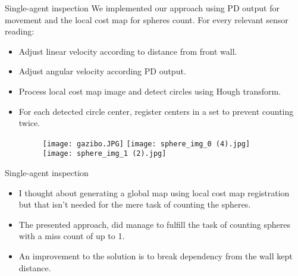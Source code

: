 \documentclass[10pt]{beamer}
\begin{document}
\begin{frame}{Single-agent inspection}
We implemented our approach using PD output for movement and the local cost map  for spheres count. For every relevant sensor reading:
\graphicspath{{images/}}
\begin{itemize}
    \item Adjust linear velocity according to distance from front wall.
    \item Adjust angular velocity according PD output.
    \item Process local cost map image and detect circles using Hough transform.
    \item For each detected circle center, register centers in a set to prevent counting twice.
    \bigskip
    
    \begin{figure}[htp]
    \texttt{[image: gazibo.JPG]}
    \texttt{[image: sphere\_img\_0 (4).jpg]}
    \texttt{[image: sphere\_img\_1 (2).jpg]}

    \label{fig:galaxy}
\end{figure}
\end{itemize}
\end{frame}

\begin{frame}{Single-agent inspection}
\begin{itemize}
    \item I thought about generating a global map using local cost map registration but that isn't needed for the mere task of counting the spheres.
    \item The presented approach, did manage to fulfill the task of counting spheres with a miss count of up to 1.
    \item An improvement to the solution is to break dependency from the wall kept distance.
\end{itemize}
\end{frame}
\end{document}
